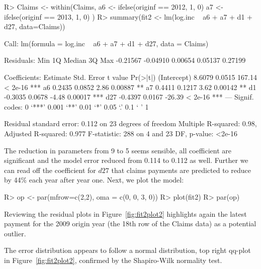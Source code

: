 \documentclass{article}
\begin{document}
\begin{Schunk}
\begin{Sinput}
R> Claims <- within(Claims, { 
     a6 <- ifelse(originf == 2012, 1, 0)
     a7 <- ifelse(originf == 2013, 1, 0)
   })
R> summary(fit2 <- lm(log.inc ~  a6 + a7 + d1 + d27, data=Claims))
\end{Sinput}
\begin{Soutput}
Call:
lm(formula = log.inc ~ a6 + a7 + d1 + d27, data = Claims)

Residuals:
     Min       1Q   Median       3Q      Max 
-0.21567 -0.04910  0.00654  0.05137  0.27199 

Coefficients:
            Estimate Std. Error t value Pr(>|t|)    
(Intercept)   8.6079     0.0515  167.14  < 2e-16 ***
a6            0.2435     0.0852    2.86  0.00887 ** 
a7            0.4411     0.1217    3.62  0.00142 ** 
d1           -0.3035     0.0678   -4.48  0.00017 ***
d27          -0.4397     0.0167  -26.39  < 2e-16 ***
---
Signif. codes:  0 ‘***’ 0.001 ‘**’ 0.01 ‘*’ 0.05 ‘.’ 0.1 ‘ ’ 1

Residual standard error: 0.112 on 23 degrees of freedom
Multiple R-squared:  0.98,	Adjusted R-squared:  0.977 
F-statistic:  288 on 4 and 23 DF,  p-value: <2e-16
\end{Soutput}
\end{Schunk}
The reduction in parameters from 9 to 5 seems sensible, all coefficient 
are significant and the model error reduced from 
0.114 to 0.112 as 
well.  Further we can read off the coefficient for $d27$ that claims 
payments are predicted to reduce by 44\% each year after year one.
Next, we plot the model:
\begin{Schunk}
\begin{Sinput}
R> op <- par(mfrow=c(2,2), oma = c(0, 0, 3, 0))
R> plot(fit2)
R> par(op)
\end{Sinput}
\end{Schunk}
Reviewing the residual plots in Figure~\ref{fig:fit2plot2} highlights 
again the latest payment for the 2009 origin year (the 18th row of the 
Claims data) as a potential outlier.

The error distribution  appears to follow a normal distribution, top right 
qq-plot in Figure~\ref{fig:fit2plot2}, confirmed by the Shapiro-Wilk normality test. 
\begin{Schunk}
\end{Schunk}
\end{document}
